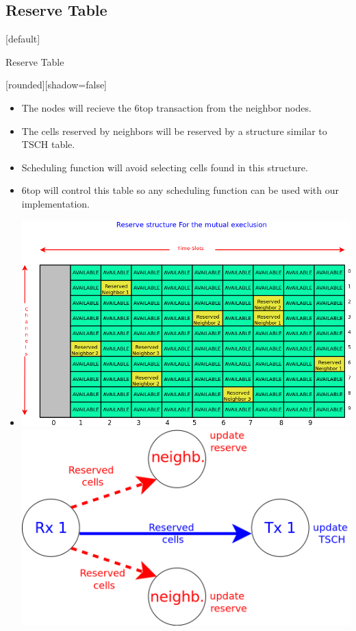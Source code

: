 \documentclass{beamer}
\makeatletter
\newenvironment{withoutheadline}{
        \setbeamertemplate{headline}[default]
        \def\beamer@entrycode{\vspace*{-\headheight}}
    }{}
\makeatother
\begin{document}
\subsection{Reserve Table}
\begin{withoutheadline}
\begin{frame}{Reserve Table}


[rounded][shadow=false]


\begin{block}

    \begin{itemize}
    \item The nodes will recieve the 6top transaction from the neighbor nodes.
    \item The cells reserved by neighbors will be reserved by a structure similar to TSCH table. 
    \item Scheduling function will avoid selecting cells found in this structure. 
    \item 6top will control this table so any scheduling function can be used with our implementation.
    \end{itemize}
    \end{block}

\centering
\begin{itemize}
\item[]
\begin{center}
\includegraphics[width=0.5\linewidth]{reserve.png}
\includegraphics[width=0.5\linewidth]{reserv1.png}
\end{center}
\end{itemize}




\end{frame}
\end{withoutheadline}
\end{document}
